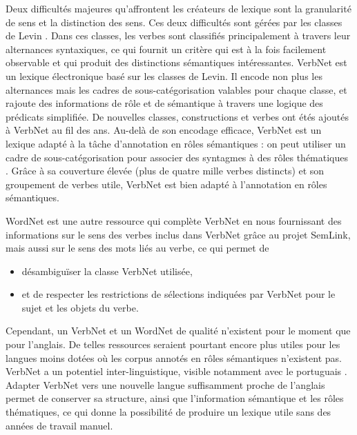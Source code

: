 Deux difficultés majeures qu'affrontent les créateurs de lexique sont la
granularité de sens et la distinction des sens. Ces deux difficultés sont
gérées par les classes de Levin \citep{levin1993english}. Dans ces classes, les
verbes sont classifiés principalement à travers leur alternances syntaxiques,
ce qui fournit un critère qui est à la fois facilement observable et qui
produit des distinctions sémantiques intéressantes. VerbNet
\citep{kipperschuler2005verbnet} est un lexique électronique basé sur les
classes de Levin. Il encode non plus les alternances mais les cadres de
sous-catégorisation valables pour chaque classe, et rajoute des informations de
rôle et de sémantique à travers une logique des prédicats simplifiée. De
nouvelles classes, constructions et verbes ont étés ajoutés à VerbNet au fil
des ans. Au-delà de son encodage efficace, VerbNet est un lexique adapté à la
tâche d'annotation en rôles sémantiques : on peut utiliser un cadre de
sous-catégorisation pour associer des syntagmes à des rôles thématiques
\citep{swier2005exploiting,pradet2013revisiting}. Grâce à sa couverture élevée
(plus de quatre mille verbes distincts) et son groupement de verbes utile,
VerbNet est bien adapté à l'annotation en rôles sémantiques.

WordNet est une autre ressource qui complète VerbNet en nous fournissant des
informations sur le sens des verbes inclus dans VerbNet grâce au projet
SemLink, mais aussi sur le sens des mots liés au verbe, ce qui permet de

\begin{itemize}

    \item désambiguïser la classe VerbNet utilisée,

    \item et de respecter les restrictions de sélections indiquées par VerbNet pour
        le sujet et les objets du verbe.

\end{itemize}


Cependant, un VerbNet et un WordNet de qualité n'existent pour le moment que
pour l'anglais. De telles ressources seraient pourtant encore plus utiles pour
les langues moins dotées où les corpus annotés en rôles sémantiques n'existent
pas. VerbNet a un potentiel inter-linguistique, visible notamment avec le
portuguais \citep[section 2.2.2]{kipperschuler2005verbnet}. Adapter VerbNet
vers une nouvelle langue suffisamment proche de l'anglais permet de conserver
sa structure, ainsi que l'information sémantique et les rôles thématiques, ce
qui donne la possibilité de produire un lexique utile sans des années de
travail manuel.

